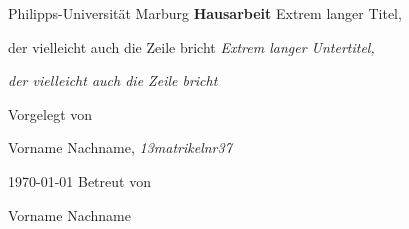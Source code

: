 \begin{titlepage}
        \vfill\vfill
        \centering
        \large Philipps-Universität Marburg
	\vfill
	\LARGE \textbf{Hausarbeit}
        \vfill
        \Large Extrem langer Titel,

        der vielleicht auch die Zeile bricht
	\large
        \vfill
        \textit{Extrem langer Untertitel,}

        \textit{der vielleicht auch die Zeile bricht}

        \vfill\vfill\vfill
	\normalsize Vorgelegt von

	\large
        Vorname Nachname, \textit{13matrikelnr37}

        \vfill\vfill
        \large \today 
	\vfill\vfill
	\normalsize Betreut von

	\large Vorname Nachname
        \vfill

\end{titlepage}

